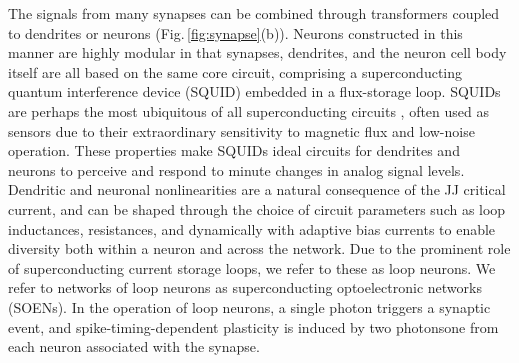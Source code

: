 \documentclass[twocolumn]{article}
\begin{document}
The signals from many synapses can be combined through transformers coupled to dendrites or neurons (Fig.\,\ref{fig:synapse}(b)). Neurons constructed in this manner are highly modular in that synapses, dendrites, and the neuron cell body itself are all based on the same core circuit, comprising a superconducting quantum interference device (SQUID) embedded in a flux-storage loop. SQUIDs are perhaps the most ubiquitous of all superconducting circuits \cite{vatu1998,ka1999}, often used as sensors due to their extraordinary sensitivity to magnetic flux and low-noise operation. These properties make SQUIDs ideal circuits for dendrites and neurons to perceive and respond to minute changes in analog signal levels. Dendritic and neuronal nonlinearities are a natural consequence of the JJ critical current, and can be shaped through the choice of circuit parameters such as loop inductances, resistances, and dynamically with adaptive bias currents to enable diversity both within a neuron and across the network. Due to the prominent role of superconducting current storage loops, we refer to these as loop neurons. We refer to networks of loop neurons as superconducting optoelectronic networks (SOENs). In the operation of loop neurons, a single photon triggers a synaptic event, and spike-timing-dependent plasticity is induced by two photons\textemdash one from each neuron associated with the synapse.
\begin{figure}
\end{figure}
\end{document}
